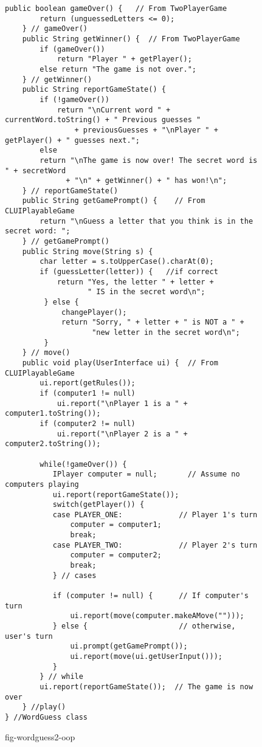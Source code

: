 \begin{figure}[h!]
\jjjprogstart
\begin{jjjlisting}[29pc]
\begin{lstlisting}[basicstyle=\scriptsize]
    public boolean gameOver() {   // From TwoPlayerGame
        return (unguessedLetters <= 0);
    } // gameOver()
    public String getWinner() {  // From TwoPlayerGame
        if (gameOver())
            return "Player " + getPlayer();
        else return "The game is not over.";
    } // getWinner()
    public String reportGameState() {   
        if (!gameOver())
            return "\nCurrent word " + currentWord.toString() + " Previous guesses " 
                + previousGuesses + "\nPlayer " + getPlayer() + " guesses next.";
        else
	    return "\nThe game is now over! The secret word is " + secretWord 
              + "\n" + getWinner() + " has won!\n";
    } // reportGameState()
    public String getGamePrompt() {    // From CLUIPlayableGame
        return "\nGuess a letter that you think is in the secret word: ";
    } // getGamePrompt()
    public String move(String s) {   
        char letter = s.toUpperCase().charAt(0);
        if (guessLetter(letter)) {   //if correct 
            return "Yes, the letter " + letter +
                   " IS in the secret word\n";
         } else {   
             changePlayer();
             return "Sorry, " + letter + " is NOT a " +
                    "new letter in the secret word\n";
         } 
    } // move()
    public void play(UserInterface ui) {  // From CLUIPlayableGame
        ui.report(getRules());
        if (computer1 != null) 
            ui.report("\nPlayer 1 is a " + computer1.toString());
        if (computer2 != null)
            ui.report("\nPlayer 2 is a " + computer2.toString());

        while(!gameOver()) {  
           IPlayer computer = null;       // Assume no computers playing
           ui.report(reportGameState());
           switch(getPlayer()) {
           case PLAYER_ONE:             // Player 1's turn
               computer = computer1;
               break;
           case PLAYER_TWO:             // Player 2's turn
               computer = computer2;
               break;
           } // cases

           if (computer != null) {      // If computer's turn
               ui.report(move(computer.makeAMove("")));
           } else {                     // otherwise, user's turn
               ui.prompt(getGamePrompt());
               ui.report(move(ui.getUserInput()));
           }
        } // while
        ui.report(reportGameState());  // The game is now over
    } //play()
} //WordGuess class
\end{lstlisting}
\end{jjjlisting}
{fig-wordguess2-oop}
\end{figure}

